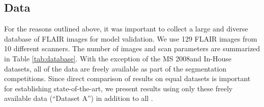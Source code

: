\subsection{Data}\label{ss:data}
For the reasons outlined above, it was important to collect a large and diverse database of FLAIR images for model validation.
We use 129 FLAIR images from 10 different scanners.
The number of images and scan parameters are summarized in Table \ref{tab:database}.
With the exception of the MS 2008\footnotemark and In-House datasets, all of the data are freely available as part of the segmentation competitions.
Since direct comparison of results on equal datasets is important for establishing state-of-the-art, we present results using only these freely available data (``Dataset A'') in addition to all .
\par

